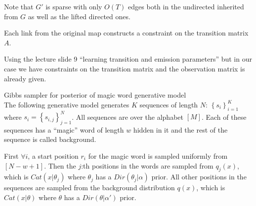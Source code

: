 \documentclass[a4paper,twoside=false,abstract=false,numbers=noenddot,
titlepage=false,headings=small,parskip=half,version=last]{scrartcl}
\begin{document}
\begin{solution}
    Note that $G'$ is sparse with only $O(T)$ edges both in the
    undirected inherited from $G$ as well as the lifted directed ones.

    Each link from the original map constructs a constraint on the transition
    matrix $A$.

    Using the lecture slide 9 
    ``learning transition and emission parameters''
    but in our case we have constraints on the transition matrix and the
    observation matrix is already given.

\end{solution}

\begin{exercise}{3}Gibbs sampler for posterior of magic word generative model\\
    The following generative model generates $K$ sequences of length $N$:
    $\left\{s_i\right\}_{i=1}^K$ where $s_i=\left\{s_{i,j}\right\}_{j=1}^N$.
    All sequences are over the alphabet $\left[M\right]$. Each of these
    sequences has a ``magic'' word of length $w$ hidden in it and the rest of
    the sequence is called background.

    First $\forall i$, a start position $r_i$ for the magic word is sampled
    uniformly from $\left[N-w+1\right]$. Then the $j$:th positions in the words
    are sampled from $q_j(x)$, which is $Cat\left(x|\theta_j\right)$ where 
    $\theta_j$ has a $Dir\left(\theta_j|\alpha\right)$ prior. All other
    positions in the sequences are sampled from the background distribution
    $q(x)$, which is $Cat\left(x|\theta\right)$ where $\theta$ has a
    $Dir\left(\theta|\alpha'\right)$ prior.
\end{exercise}
\begin{solution}
    
\end{solution}
\end{document}
